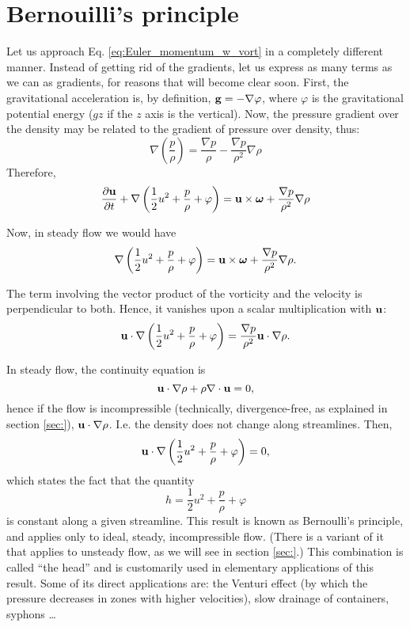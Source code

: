 \section{Bernouilli's principle}

Let us approach Eq. \ref{eq:Euler_momentum_w_vort} in a completely
different manner. Instead of getting rid of the gradients, let us
express as many terms as we can as gradients, for reasons that will
become clear soon. First, the gravitational acceleration is, by
definition, $\mathbf{g} = -\nabla\varphi$, where $\varphi $ is the
gravitational potential energy ($g z$ if the $z$ axis is the
vertical). Now, the pressure gradient over the density may be related
to the gradient of pressure over density, thus:
\[
\nabla
\left(
\frac{p}{\rho}
\right) =
\frac{ \nabla p }{\rho} -
\frac{ \nabla p }{\rho^2} \nabla \rho 
\]
Therefore,
\[
\frac{\partial \mathbf{u} }{\partial t} +
 \nabla
\left(
\frac12 u^2 +
\frac{p}{\rho} +
\varphi
\right)
=
  \mathbf{u} \times\bm{\omega} +
 \frac{ \nabla p }{\rho^2} \nabla \rho 
\]

Now, in steady flow we would have
\[
\nabla
\left(
\frac12 u^2 +
\frac{p}{\rho} +
\varphi
\right)
=
  \mathbf{u} \times\bm{\omega} +
 \frac{ \nabla p }{\rho^2} \nabla \rho  .
\]

The term involving the vector product of the vorticity and the
velocity is perpendicular to both. Hence, it vanishes upon a scalar
multiplication with $\mathbf{u}$:
\[
\mathbf{u}\cdot
\nabla
\left(
\frac12 u^2 +
\frac{p}{\rho} +
\varphi
\right)
=
\frac{ \nabla p }{\rho^2} \mathbf{u}\cdot \nabla \rho  .
\]
 
In steady flow, the continuity equation is
\[
\mathbf{u}\cdot \nabla \rho  +
\rho \nabla \cdot \mathbf{u} = 0 ,
\]
hence if the flow is incompressible (technically, divergence-free, as
explained in section \ref{sec:}), $\mathbf{u}\cdot \nabla \rho $. I.e. the
density does not change along streamlines. Then,
\[
\mathbf{u}\cdot
\nabla
\left(
\frac12 u^2 +
\frac{p}{\rho} +
\varphi
\right)
=
0 ,
\]
which states the fact that the quantity
\[
h = \frac12 u^2 + \frac{p}{\rho} + \varphi
\]
is constant along a given streamline. This result is known as
Bernoulli's principle, and applies only to ideal, steady,
incompressible flow. (There is a variant of it that applies to
unsteady flow, as we will see in section \ref{sec:}.)
%
This combination is called ``the head'' and is customarily used in
elementary applications of this result. Some of its direct
applications are: the Venturi effect (by which the pressure decreases
in zones with higher velocities), slow drainage of containers, syphons
\ldots

